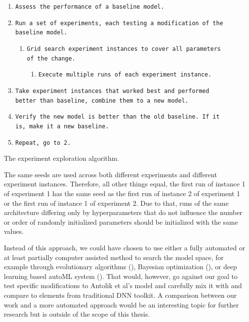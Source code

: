 \begin{enumerate}[noitemsep]
    \item \texttt{Assess the performance of a baseline model.}
    \item \texttt{Run a set of experiments, each testing a modification of the\\ baseline model.}
    \begin{enumerate}[nosep]
        \item \texttt{Grid search experiment instances to cover all parameters\\ of the change.}
        \begin{enumerate}[nosep]
            \item \texttt{Execute multiple runs of each experiment instance.}
        \end{enumerate}
    \end{enumerate}
    \item \texttt{Take experiment instances that worked best and performed\\ better than baseline, combine them to a new model.}
    \item \texttt{Verify the new model is better than the old baseline. If it\\ is, make it a new baseline.}
    \item \texttt{Repeat, go to 2.}
\end{enumerate}
\begin{center}
    {The experiment exploration algorithm.}
\end{center}

The same seeds are used across both different experiments and different experiment instances. Therefore, all other things equal, the first run of instance 1 of experiment 1 has the same seed as the first run of instance 2 of experiment 1 or the first run of instance 1 of experiment 2. Due to that, runs of the same architecture differing only by hyperparameters that do not influence the number or order of randomly initialized parameters should be initialized with the same values.

Instead of this approach, we could have chosen to use either a fully automated or at least partially computer assisted method to search the model space, for example through evolutionary algorithms (\cite{2017arXiv170300548M}), Bayesian optimization (\cite{thesis_arnold}), or deep learning based autoML system (\cite{2016arXiv161101578Z}). That would, however, go against our goal to test specific modifications to Antolik et al’s model and carefully mix it with and compare to elements from traditional DNN toolkit. A comparison between our work and a more automated approach would be an interesting topic for further research but is outside of the scope of this thesis.

